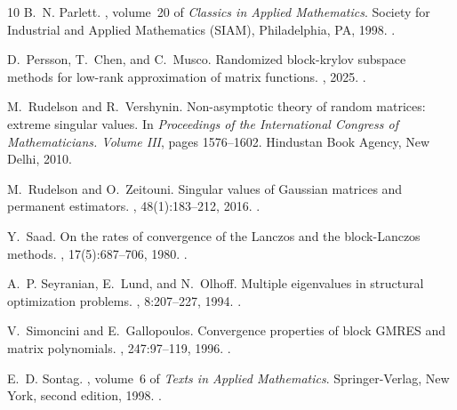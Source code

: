 \documentclass{article}
\begin{document}
\begin{thebibliography}{10}
B.~N. Parlett.
, volume~20 of {\em Classics in
  Applied Mathematics}.
\newblock Society for Industrial and Applied Mathematics (SIAM), Philadelphia,
  PA, 1998.
\newblock \href {https://doi.org/10.1137/1.9781611971163}
  {}.

D.~Persson, T.~Chen, and C.~Musco.
\newblock Randomized block-krylov subspace methods for low-rank approximation
  of matrix functions.
, 2025.
\newblock \href {https://doi.org/10.48550/arXiv.2502.01888}
  {}.

M.~Rudelson and R.~Vershynin.
\newblock Non-asymptotic theory of random matrices: extreme singular values.
\newblock In {\em Proceedings of the {I}nternational {C}ongress of
  {M}athematicians. {V}olume {III}}, pages 1576--1602. Hindustan Book Agency,
  New Delhi, 2010.

M.~Rudelson and O.~Zeitouni.
\newblock Singular values of {G}aussian matrices and permanent estimators.
, 48(1):183--212, 2016.
\newblock \href {https://doi.org/10.1002/rsa.20564}
  {}.

Y.~Saad.
\newblock On the rates of convergence of the {L}anczos and the block-{L}anczos
  methods.
, 17(5):687--706, 1980.
\newblock \href {https://doi.org/10.1137/0717059} {}.

A.~P. Seyranian, E.~Lund, and N.~Olhoff.
\newblock Multiple eigenvalues in structural optimization problems.
, 8:207--227, 1994.
\newblock \href {https://doi.org/10.1007/BF01742705}
  {}.

V.~Simoncini and E.~Gallopoulos.
\newblock Convergence properties of block {GMRES} and matrix polynomials.
, 247:97--119, 1996.
\newblock \href {https://doi.org/10.1016/0024-3795(95)00093-3}
  {}.

E.~D. Sontag.
, volume~6 of {\em Texts in Applied
  Mathematics}.
\newblock Springer-Verlag, New York, second edition, 1998.
\newblock \href {https://doi.org/10.1007/978-1-4612-0577-7}
  {}.


\end{thebibliography}
\end{document}
